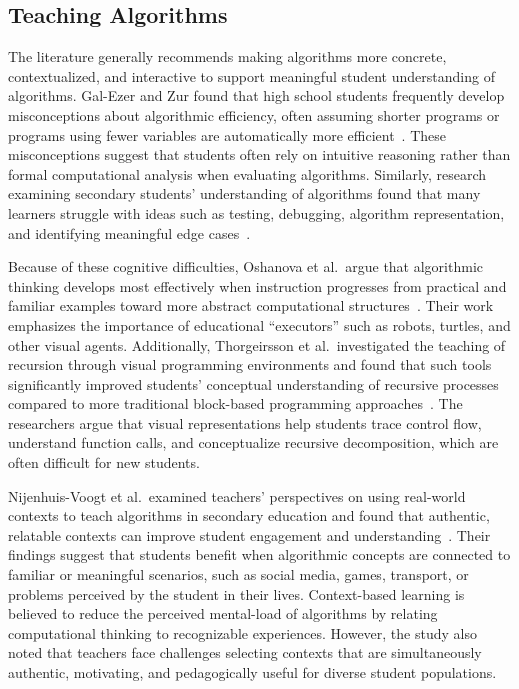 \subsection{Teaching Algorithms}

The literature generally recommends making algorithms more concrete, contextualized, and interactive to support meaningful student understanding of
  algorithms.
Gal-Ezer and Zur found that high school students frequently develop misconceptions about algorithmic efficiency, often assuming shorter programs or
  programs using fewer variables are automatically more efficient~\cite{gal2004efficiency}.
These misconceptions suggest that students often rely on intuitive reasoning rather than formal computational analysis when evaluating algorithms.
Similarly, research examining secondary students' understanding of algorithms found that many learners struggle with ideas such as testing,
  debugging, algorithm representation, and identifying meaningful edge cases~\cite{basu2023exploring}.

Because of these cognitive difficulties, Oshanova et al.\ argue that algorithmic thinking develops most effectively when instruction progresses from
  practical and familiar examples toward more abstract computational structures~\cite{Oshanova2019}.
Their work emphasizes the importance of educational “executors” such as robots, turtles, and other visual agents.
Additionally, Thorgeirsson et al.\ investigated the teaching of recursion through visual programming environments and found that such tools
  significantly improved students' conceptual understanding of recursive processes compared to more traditional block-based programming
  approaches~\cite{Lais2024}.
The researchers argue that visual representations help students trace control flow, understand function calls, and conceptualize recursive
  decomposition, which are often difficult for new students.

Nijenhuis-Voogt et al.\ examined teachers' perspectives on using real-world contexts to teach algorithms in secondary education and found that
  authentic, relatable contexts can improve student engagement and understanding~\cite{Voog2012}.
Their findings suggest that students benefit when algorithmic concepts are connected to familiar or meaningful scenarios, such as social media,
  games, transport, or problems perceived by the student in their lives.
Context-based learning is believed to reduce the perceived mental-load of algorithms by relating computational thinking to recognizable experiences.
However, the study also noted that teachers face challenges selecting contexts that are simultaneously authentic, motivating, and pedagogically
  useful for diverse student populations.

